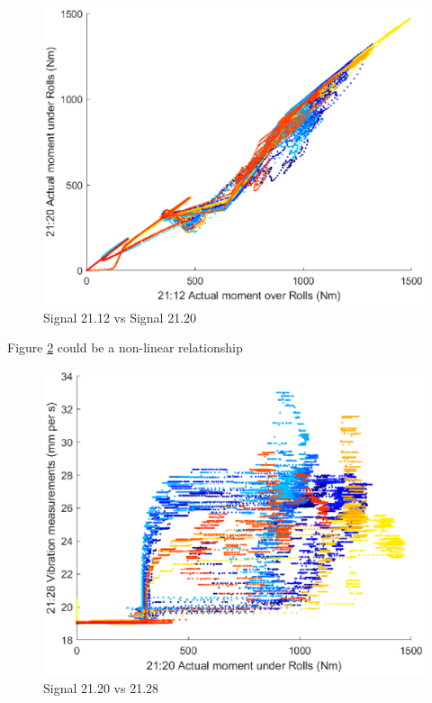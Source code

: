 \documentclass{article}
\begin{document}
\begin{figure}[H]
    \centering
    \includegraphics[width=\textwidth, height=\textheight, keepaspectratio]{figures/Signal21_12vSignal21_20.eps}
    \caption{Signal 21.12 vs Signal 21.20}
    \label{fig:Signal21_12vSignal21_20}
\end{figure}	

Figure \ref{fig:Signal21_20vSignal21_28} could be a non-linear relationship
\begin{figure}[H]
    \centering
    \includegraphics[width=\textwidth, height=\textheight, keepaspectratio]{figures/Signal21_20vSignal21_28.eps}
    \caption{Signal 21.20 vs 21.28}
    \label{fig:Signal21_20vSignal21_28}
\end{figure}	
	
\end{document}
